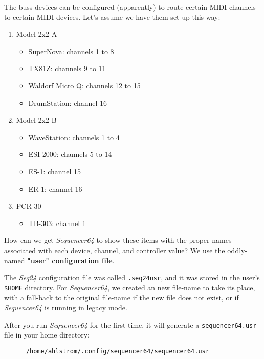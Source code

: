    The buss devices can be configured (apparently) to route certain
   MIDI channels to certain MIDI devices.  Let's assume we have them
   set up this way:

   \begin{enumerate}
      \item Model 2x2 A
      \begin{itemize}
         \item SuperNova: channels 1 to 8
         \item TX81Z: channels 9 to 11
         \item Waldorf Micro Q: channels 12 to 15
         \item DrumStation: channel 16
      \end{itemize}
      \item Model 2x2 B
      \begin{itemize}
         \item WaveStation: channels 1 to 4
         \item ESI-2000: channels 5 to 14
         \item ES-1: channel 15
         \item ER-1: channel 16
      \end{itemize}
      \item PCR-30
      \begin{itemize}
         \item TB-303: channel 1
      \end{itemize}
   \end{enumerate}

   How can we get \textsl{Sequencer64} to show these items with the proper
   names associated with each device, channel, and controller value?
   We use the oddly-named \textbf{"user" configuration file}.

   The \textsl{Seq24} configuration file was called
   \texttt{.seq24usr}, and it was stored in the user's \texttt{\$HOME}
   directory.
   For \textsl{Sequencer64}, we created an new file-name
   to take its place, with a fall-back to the original file-name if the new
   file does not exist, or if \textsl{Sequencer64} is running in
   legacy mode.

   After you run \textsl{Sequencer64} for the first time, it will generate a
   \texttt{sequencer64.usr} file in your home directory:

   \begin{verbatim}
      /home/ahlstrom/.config/sequencer64/sequencer64.usr
   \end{verbatim}

